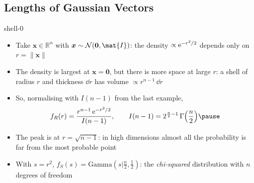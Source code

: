 \begin{slide}
\section[-1]{Lengths of Gaussian Vectors}

\begin{PauseHighLight}
  \begin{rightImage}[0.22]{shell-0}
  \begin{itemize}\squeeze
  \item Take $\bm{x}\in\mathbb{R}^n$ with $\bm{x}\sim\mathcal{N}(\bm{0},\mat{I})$:
    the density $\propto{\rm e}^{-r^2/2}$ depends only on $r = \|\bm{x}\|$\pause
  \item The density is largest at $\bm{x}=\bm{0}$, but there is more space
    at large $r$: a shell of radius $r$ and thickness $\dd r$ has volume
    $\propto r^{n-1}\,\dd r$\pause
  \end{itemize}
  \end{rightImage}
  \begin{itemize}\squeeze
  \item So, normalising with $I(n-1)$ from the last example,
    \begin{align*}
      f_R(r) = \frac{r^{n-1}\,\e{-r^2/2}}{I(n-1)}, \qquad
      I(n-1) = 2^{\frac{n}{2}-1}\,\Gamma\Bigl(\frac{n}{2}\Bigr)\pause
    \end{align*}
  \item The peak is at $r = \sqrt{n-1}$: in high dimensions almost all the
    probability is far from the most probable point\pause
  \item With $s = r^2$, $f_S(s) = \mathrm{Gamma}(s|\frac{n}{2},\frac12)$: the
    \emph{chi-squared} distribution with $n$ degrees of freedom\pause
  \end{itemize}
\end{PauseHighLight}

\end{slide}

